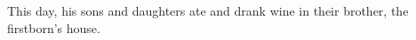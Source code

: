 \begin{inparaenum}
   This day, his sons and daughters ate and drank wine in their brother, the firstborn's house.%
   \smallskip%
  
  \pvba{}%
  
  \pvba{}%
  
  {\noindent{} \smallskip}%
  
  \pvbb{}{}%
  
  \pvba{}%
  
  \pvba{}%
  
  {\noindent{} \smallskip}%
  
  \pvbb{}{}%
  
  
  \pvbb{}{}%
  
  \pvba{}%
  
  {\noindent{} \smallskip}%
  
  \pveb{}{}%
  \pveb{}{}%
  
  {\noindent{} }%
\end{inparaenum}
